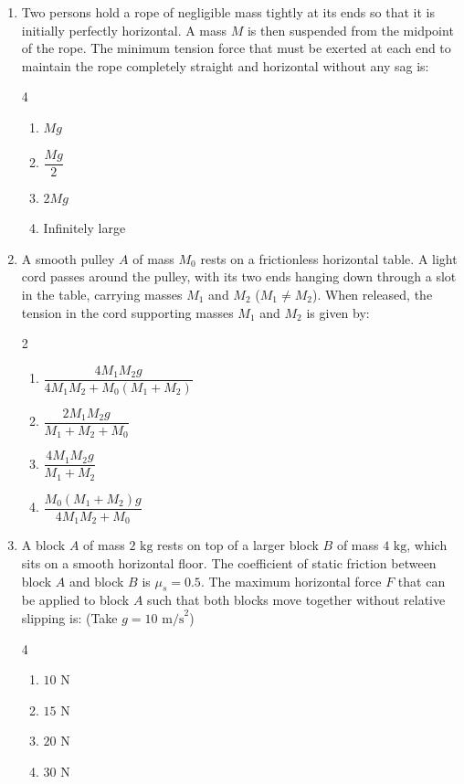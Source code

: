 \documentclass[11pt,a4paper]{article}
\begin{document}
\begin{enumerate}[label=\textbf{\arabic*.},leftmargin=18pt,itemsep=8pt,resume]

  \item Two persons hold a rope of negligible mass tightly at its ends so that it is initially perfectly horizontal. A mass $M$ is then suspended from the midpoint of the rope. The minimum tension force that must be exerted at each end to maintain the rope completely straight and horizontal without any sag is:
  \begin{multicols}{4}
    \begin{enumerate}[label=(\Alph*)]
      \item $Mg$
      \item $\dfrac{Mg}{2}$
      \item $2Mg$
      \item Infinitely large
    \end{enumerate}
  \end{multicols}

  \item A smooth pulley $A$ of mass $M_0$ rests on a frictionless horizontal table. A light cord passes around the pulley, with its two ends hanging down through a slot in the table, carrying masses $M_1$ and $M_2$ ($M_1 \ne M_2$). When released, the tension in the cord supporting masses $M_1$ and $M_2$ is given by:
  \begin{multicols}{2}
    \begin{enumerate}[label=(\Alph*)]
      \item $\dfrac{4M_1 M_2 g}{4M_1 M_2 + M_0(M_1 + M_2)}$
      \item $\dfrac{2M_1 M_2 g}{M_1 + M_2 + M_0}$
      \item $\dfrac{4M_1 M_2 g}{M_1 + M_2}$
      \item $\dfrac{M_0(M_1 + M_2)g}{4M_1 M_2 + M_0}$
    \end{enumerate}
  \end{multicols}

  \item A block $A$ of mass $2\text{ kg}$ rests on top of a larger block $B$ of mass $4\text{ kg}$, which sits on a smooth horizontal floor. The coefficient of static friction between block $A$ and block $B$ is $\mu_s = 0.5$. The maximum horizontal force $F$ that can be applied to block $A$ such that both blocks move together without relative slipping is: (Take $g = 10\text{ m/s}^2$)
  \begin{multicols}{4}
    \begin{enumerate}[label=(\Alph*)]
      \item $10\text{ N}$
      \item $15\text{ N}$
      \item $20\text{ N}$
      \item $30\text{ N}$
    \end{enumerate}
  \end{multicols}


\end{enumerate}
\end{document}
